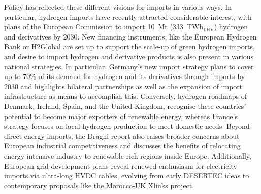
Policy has reflected these different visions for imports in various ways. In
particular, hydrogen imports have recently attracted considerable interest, with
plans of the European Commission\cite{europeancommissionRepowerEUPlan} to import
10~Mt (333~TWh$_\text{LHV}$) hydrogen and derivatives by 2030. New financing
instruments, like the European Hydrogen
Bank\cite{europeancommissionEuropeanHydrogenBank2024} or
H2Global\cite{h2globalfoundationH2Global2024} are set up to support the scale-up
of green hydrogen imports, and desire to import hydrogen and derivative products
is also present in various national
strategies.\cite{corbeauNationalHydrogenStrategies2024} In particular, Germany's
new import strategy plans to cover up to 70\% of its demand for hydrogen and its
derivatives through imports by 2030 and highlights bilateral partnerships as
well as the expansion of import infrastructure as means to accomplish
this.\cite{germanfederalministryofeconomicaffairsandclimateactionbmwkNationalHydrogenStrategy2023,germanfederalministryofeconomicaffairsandclimateactionbmwkImportStrategyHydrogen2024}
Conversely, hydrogen roadmaps of
Denmark,\cite{danishministryofclimateenergyandutilitiesRegeringensStrategiPowertoX2021}
Ireland,\cite{departmentoftheenvironmentclimateandcommunicationsgovernmentofirelandNationalHydrogenStrategy2023} 
Spain,\cite{marcoestrategicodeenergiayclimaRutaHidrogenoApuesta2020} and the
United
Kingdom,\cite{ukdepartmentforenergysecurity&netzeroHydrogenStrategyUpdate2023}
recognise these countries' potential to become major exporters of renewable
energy, whereas France's strategy focuses on local hydrogen production to meet
domestic needs.\cite{frenchgovernmentStrategieNationalePour2023} Beyond direct
energy imports, the Draghi report\cite{draghiFutureEuropeanCompetitiveness2024}
also raises broader concerns about European industrial competitiveness and
discusses the benefits of relocating energy-intensive industry to renewable-rich
regions inside Europe. Additionally, European grid development
plans\cite{entso-eTYNDP2024Project2024} reveal renewed enthusiasm for
electricity imports via ultra-long HVDC cables, evolving from early
DESERTEC\cite{desertecfoundationDESERTECSustainableWealth2024} ideas to
contemporary proposals like the Morocco-UK Xlinks
project.\cite{xlinksMoroccoUKPowerProject2023}


